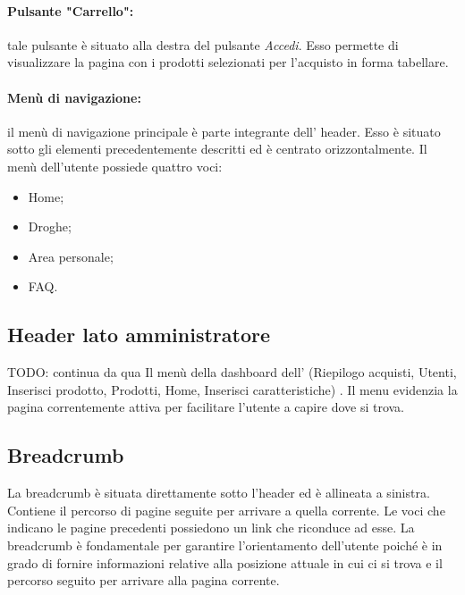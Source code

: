 \paragraph{Pulsante "Carrello":} tale pulsante è situato alla destra del pulsante \textit{Accedi}. Esso permette di visualizzare la pagina con i prodotti selezionati per l'acquisto in forma tabellare.

\paragraph{Menù di navigazione: }il menù di navigazione principale è parte integrante dell' header. Esso è situato sotto gli elementi precedentemente descritti ed è centrato orizzontalmente. Il menù dell'utente possiede quattro voci:
\begin{itemize}
    \item Home;
    \item Droghe;
    \item Area personale;
    \item FAQ.
\end{itemize}
\subsection{Header lato amministratore} TODO: continua da qua
Il menù della dashboard dell' (Riepilogo acquisti, Utenti, Inserisci prodotto, Prodotti, Home, Inserisci caratteristiche) . Il menu evidenzia la pagina correntemente attiva per facilitare l'utente a capire dove si trova.

    
    
\subsection{Breadcrumb} 
La breadcrumb è situata direttamente sotto l'header ed è allineata a sinistra. Contiene il percorso di pagine seguite per arrivare a quella corrente. Le voci che indicano le pagine precedenti possiedono un link che riconduce ad esse. La breadcrumb è fondamentale per garantire l'orientamento dell'utente poiché è in grado di fornire informazioni relative alla posizione attuale in cui ci si trova e il percorso seguito per arrivare alla pagina corrente. 
